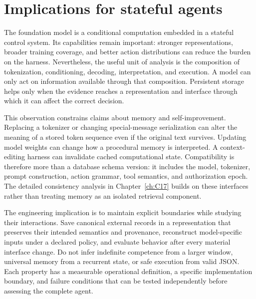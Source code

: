 \section{Implications for stateful agents}
\label{sec:C03:implications}
The foundation model is a conditional computation embedded in a stateful control system. Its capabilities remain important: stronger representations, broader training coverage, and better action distributions can reduce the burden on the harness. Nevertheless, the useful unit of analysis is the composition of tokenization, conditioning, decoding, interpretation, and execution. A model can only act on information available through that composition. Persistent storage helps only when the evidence reaches a representation and interface through which it can affect the correct decision.

This observation constrains claims about memory and self-improvement. Replacing a tokenizer or changing special-message serialization can alter the meaning of a stored token sequence even if the original text survives. Updating model weights can change how a procedural memory is interpreted. A context-editing harness can invalidate cached computational state. Compatibility is therefore more than a database schema version: it includes the model, tokenizer, prompt construction, action grammar, tool semantics, and authorization epoch. The detailed consistency analysis in Chapter~\ref{ch:C17} builds on these interfaces rather than treating memory as an isolated retrieval component.

The engineering implication is to maintain explicit boundaries while studying their interactions. Save canonical external records in a representation that preserves their intended semantics and provenance, reconstruct model-specific inputs under a declared policy, and evaluate behavior after every material interface change. Do not infer indefinite competence from a larger window, universal memory from a recurrent state, or safe execution from valid JSON. Each property has a measurable operational definition, a specific implementation boundary, and failure conditions that can be tested independently before assessing the complete agent.

